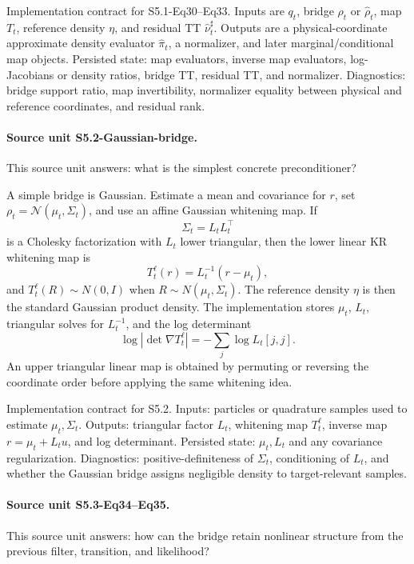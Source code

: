 \documentclass[11pt]{article}
\begin{document}
Implementation contract for S5.1-Eq30--Eq33.  Inputs are \(q_t\), bridge
\(\rho_t\) or \(\widehat\rho_t\), map \(T_t\), reference density \(\eta\), and
residual TT \(\widehat\nu_t^\sharp\).  Outputs are a physical-coordinate
approximate density evaluator \(\widehat\pi_t\), a normalizer, and later
marginal/conditional map objects.  Persisted state: map evaluators, inverse map
evaluators, log-Jacobians or density ratios, bridge TT, residual TT, and
normalizer.  Diagnostics: bridge support ratio, map invertibility,
normalizer equality between physical and reference coordinates, and residual
rank.

\paragraph{Source unit S5.2-Gaussian-bridge.}
This source unit answers: what is the simplest concrete preconditioner?

A simple bridge is Gaussian.  Estimate a mean and covariance for \(r\), set
\(\rho_t=\mathcal N(\mu_t,\Sigma_t)\), and use an affine Gaussian whitening map.
If
\[
    \Sigma_t=L_tL_t^\top
    \tag{P6a}
\]
is a Cholesky factorization with \(L_t\) lower triangular, then the lower
linear KR whitening map is
\[
    T_t^{\ell}(r)
    =
    L_t^{-1}(r-\mu_t),
    \tag{P6b}
\]
and \(T_t^{\ell}(R)\sim N(0,I)\) when \(R\sim N(\mu_t,\Sigma_t)\).  The
reference density \(\eta\) is then the standard Gaussian product density.  The
implementation stores \(\mu_t\), \(L_t\), triangular solves for \(L_t^{-1}\),
and the log determinant
\[
    \log|\det\nabla T_t^{\ell}|
    =
    -\sum_j\log L_t[j,j].
    \tag{P6c}
\]
An upper triangular linear map is obtained by permuting or reversing the
coordinate order before applying the same whitening idea.

Implementation contract for S5.2.  Inputs: particles or quadrature samples used
to estimate \(\mu_t,\Sigma_t\).  Outputs: triangular factor \(L_t\), whitening
map \(T_t^\ell\), inverse map \(r=\mu_t+L_tu\), and log determinant.  Persisted
state: \(\mu_t,L_t\) and any covariance regularization.  Diagnostics:
positive-definiteness of \(\Sigma_t\), conditioning of \(L_t\), and whether the
Gaussian bridge assigns negligible density to target-relevant samples.

\paragraph{Source unit S5.3-Eq34--Eq35.}
This source unit answers: how can the bridge retain nonlinear structure from
the previous filter, transition, and likelihood?
\end{document}
